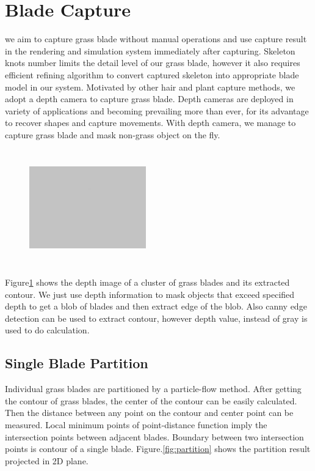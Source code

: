 \documentclass[10pt,journal,compsoc]{IEEEtran}
\begin{document}
\section{Blade Capture}\label{sec:capture}
we aim to capture grass blade without manual operations and use capture result in the rendering and simulation system immediately after capturing. Skeleton knots number limits the detail level of our grass blade, however it also requires efficient refining algorithm to convert captured skeleton into appropriate blade model in our system. Motivated by other hair and plant capture methods, we adopt a depth camera to capture grass blade. Depth cameras are deployed in variety of applications and becoming prevailing more than ever, for its advantage to recover shapes and capture movements. With depth camera, we manage to capture grass blade and mask non-grass object on the fly.\\

\begin{figure}
    \centering
    \includegraphics[width=0.45\textwidth,height=5cm]{figs/test2.jpg}
    \label{fig:depthimage}
\end{figure}

Figure\ref{fig:depthimage} shows the depth image of a cluster of grass blades and its extracted contour. We just use depth information to mask objects that exceed specified depth to get a blob of blades and then extract edge of the blob. Also canny edge detection can be used to extract contour, however depth value, instead of gray is used to do calculation.

\subsection{Single Blade Partition}

Individual grass blades are partitioned by a particle-flow method\cite{neubert2007approximate}. After getting the contour of grass blades, the center of the contour can be easily calculated. Then the distance between any point on the contour and center point can be measured. Local minimum points of point-distance function imply the intersection points between adjacent blades. Boundary between two intersection points is contour of a single blade. Figure.\ref{fig:partition} shows the partition result projected in 2D plane.
\end{document}

